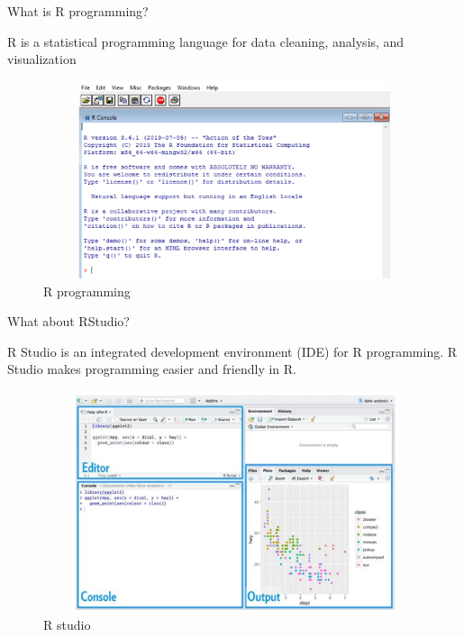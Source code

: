 \documentclass[
  ignorenonframetext,
]{beamer}
\begin{document}
\begin{frame}{What is R programming?}

R is a statistical programming language for data cleaning, analysis, and visualization
\begin{figure}
	\centering
	\includegraphics[height=5.8cm, width=13cm]{Images/R.png}
	\caption{R programming}
\end{figure}

\end{frame}


\begin{frame}{What about RStudio?}
	\protect\hypertarget{what-about-rstudio}{}

	R Studio is an integrated development environment (IDE) for R
	programming. R Studio makes programming easier and friendly in R.
	
	\begin{figure}
		\centering
		\includegraphics[height=6.5cm, width= 12cm]{Images/R_studio.PNG}
		\caption{R studio}
	\end{figure}
	
\end{frame}
\end{document}
